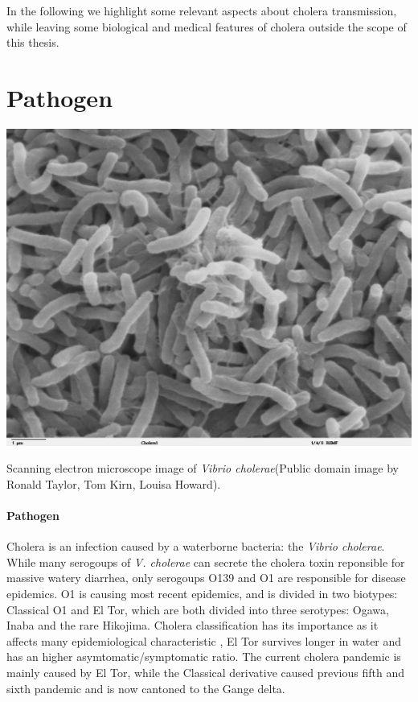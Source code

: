 In the following we highlight some relevant aspects about cholera transmission, while leaving some biological and medical features of cholera outside the scope of this thesis.


\section{Pathogen} 
\begin{marginfigure}[3\baselineskip]
\centering
\includegraphics{fig/vibrio}
\caption[Vibrio cholerae bacteria]{\footnotesize Scanning electron microscope image of \textit{Vibrio cholerae}(Public domain image by Ronald Taylor, Tom Kirn, Louisa Howard).}
\label{rain}
\end{marginfigure}

\paragraph{Pathogen} Cholera is an infection caused by a waterborne bacteria: the \emph{Vibrio cholerae}. While many serogoups of \emph{V. cholerae} can secrete the cholera toxin reponsible for massive watery diarrhea, only serogoups O139 and O1 are responsible for disease epidemics. O1 is causing most recent epidemics, and is divided in two biotypes: Classical O1 and El Tor, which are both divided into three serotypes: Ogawa, Inaba and the rare Hikojima\cite{Kaper:Cholera:1995}. Cholera classification has its importance as it affects many epidemiological characteristic \eg, El Tor survives longer in water and has an higher asymtomatic/symptomatic ratio\cite{WHO:CholeraVaccinesWHO:2017}. The current cholera pandemic is mainly caused by El Tor, while the Classical derivative caused previous fifth and sixth pandemic and is now cantoned to the Gange delta\cite{Nair:CholeraDueAltered:2006}. 

